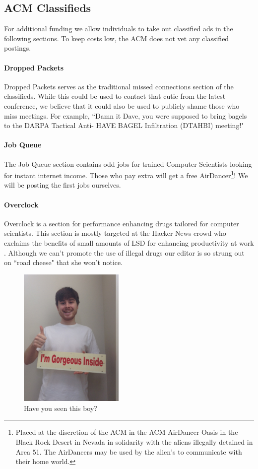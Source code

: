 \subsection{ACM Classifieds}
For additional funding we allow individuals to take out classified ads in the
following sections.
To keep costs low, the ACM does not vet any classified postings.

\paragraph{Dropped Packets}
Dropped Packets serves as the traditional missed connections section of the
classifieds.
While this could be used to contact that cutie from the latest conference, we
believe that it could also be used to publicly shame those who miss meetings.
For example, ``Damn it Dave, you were supposed to bring bagels to the DARPA
Tactical Anti- HAVE BAGEL Infiltration 
(DTAHBI) meeting!"

\paragraph{Job Queue}
The Job Queue section contains odd jobs for trained Computer Scientists looking
for instant internet income.
Those who pay extra will get a free AirDancer\footnote{Placed at the discretion
of the ACM in the ACM AirDancer Oasis in the Black Rock Desert in Nevada in
solidarity with the aliens illegally detained in Area 51.  The AirDancers may
be used by the alien's to communicate with their home world.}!
We will be posting the first jobs ourselves.

\paragraph{Overclock}
Overclock is a section for performance enhancing drugs tailored for computer
scientists.
This section is mostly targeted at the Hacker News \cite{hn} crowd who exclaims
the benefits of small amounts of LSD for enhancing productivity at work
\cite{microdose, lsd-song}.
Although we can't promote the use of illegal drugs our editor is so strung out
on ``road cheese" that she won't notice.

\begin{figure}
\centering
\includegraphics[width=0.45\textwidth]{figures/ad.jpg}
\caption{Have you seen this boy?}
\end{figure}
